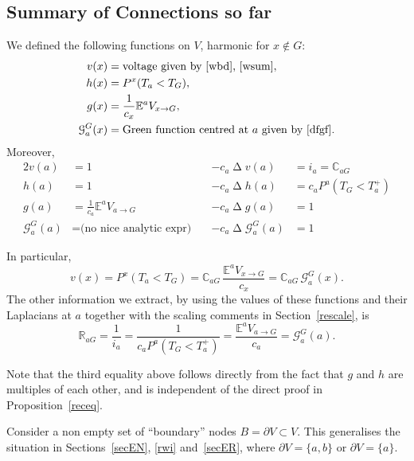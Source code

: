 \documentclass[a4paper]{amsart}
\theoremstyle{plain}
\theoremstyle{definition}
\theoremstyle{remark}
\DeclareMathOperator{\lap}{\Delta}
\begin{document}
\subsection{Summary of Connections so far}
We defined the following functions on $V $, harmonic for $ x \notin G $: 
\begin{align*}
  v(x) &= \text{voltage  given by  \eqref{wbd}, \eqref{wsum}}, \\
h(x) &=P^x(T_a < T_G), \\
 g(x) &= \frac{1}{c_x} \mathbb{E}^a  V_{x\to G},  \\
\mathcal{G}^G_a(x)&= \text{Green function centred at $  a $ given by \eqref{dfgf}}.
\end{align*} 
Moreover, 
\begin{alignat*}{2}
v(a) &=1      &   -c_a\lap v(a)    &= i_a = \mathbb{C}_{aG} \\
h(a) &=1      &   -c_a\lap h(a)   &=  c_a P^a(T_G < T_a^+) \\
g(a) &= \frac{1}{c_a} \mathbb{E}^aV_{a\to G}   &    -c_a\lap g(a)   &=   1\\
\mathcal{G}_a^G(a) &= \text{(no nice analytic expr)}  \quad &    -c_a\lap \mathcal{G}_a^G(a)   &=   1 
\end{alignat*} 

In particular,
\begin{equation} \label{ir1}
 \boxed{v(x) = P^x(T_a < T_G)  
         =  \mathbb{C}_{aG}\,  \frac{ \mathbb{E}^aV_{x\to G} }{c_x} =  \mathbb{C}_{aG}\,  \mathcal{G}^G_a(x)  .}
\end{equation} 
The other information we extract, by using the values of these functions and their Laplacians at $ a $  together with the scaling comments in Section~\ref{rescale}, is
\begin{equation} \label{abi} 
\boxed{\mathbb{R}_{aG} = \frac{1}{i_a} = \frac{1}{c_a P^a(T_G < T_a^+) }
           =  \frac  {\mathbb{E}^aV_{a\to G}}{c_a}  =  \mathcal{G}_a^G(a).   }
\end{equation} 

Note that the third equality above follows directly from the fact that $  g$  and $ h$  are  multiples of each other, and is independent of the direct proof in Proposition~\ref{receq}.


Consider a non empty set of ``boundary'' nodes $   B = \partial V \subset V $.  This generalises the situation in Sections~\ref{secEN}, \ref{rwi} and~\ref{secER}, where $ \partial V = \{a,b\} $ or $ \partial V = \{ a \} $. 
\end{document}
